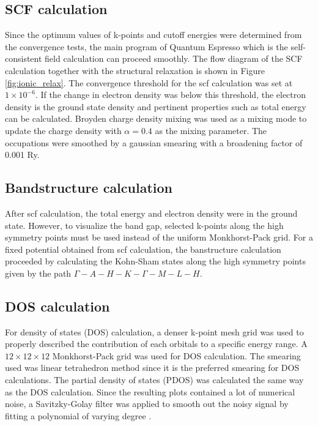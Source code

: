     \subsection{SCF calculation}
        Since the optimum values of k-points and cutoff energies were determined from the convergence tests, the main program of Quantum Espresso which is the self-consistent field calculation can proceed smoothly. The flow diagram of the SCF calculation together with the structural relaxation is shown in Figure \ref{fig:ionic_relax}. The convergence threshold for the scf calculation was set at $1 \times 10^{-6}$. If the change in electron density was below this threshold, the electron density is the ground state density and pertinent properties such as total energy can be calculated. Broyden charge density mixing was used as a mixing mode to update the charge density with  $\alpha = 0.4$ as the mixing parameter.   The occupations were smoothed by a gaussian smearing with a broadening factor of 0.001 Ry. 

        \subsection{Bandstructure calculation}
        After scf calculation, the total energy and electron density were in the ground state. However, to visualize the band gap, selected k-points along the high symmetry points must be used instead of the uniform Monkhorst-Pack grid. For a fixed potential obtained from scf calculation, the banstructure calculation proceeded by calculating the Kohn-Sham states along the high symmetry points given by the path $\Gamma-A-H-K-\Gamma-M-L-H$. 

        \subsection{DOS calculation}
        For density of states (DOS) calculation, a denser k-point mesh grid was used to properly described the contribution of each orbitals to a  specific energy range. A $12 \times 12 \times 12$ Monkhorst-Pack grid was used for DOS calculation. The smearing used was linear tetrahedron method since it is the preferred smearing for DOS calculations. The partial density of states (PDOS) was calculated the same way as the  DOS calculation. Since the resulting plots contained a lot of numerical noise, a Savitzky-Golay filter was applied to smooth out the noisy signal by fitting a polynomial of varying degree \citep{Savitzky1964,Luo2005}.

